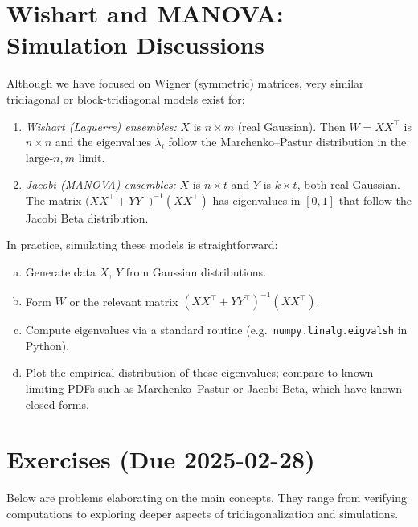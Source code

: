 \documentclass[letterpaper,11pt,oneside,reqno]{article}
\numberwithin{equation}{section}
\theoremstyle{definition}
\begin{document}
\section{Wishart and MANOVA: Simulation Discussions}
\label{sec:wishart-manova}

Although we have focused on Wigner (symmetric) matrices, very similar tridiagonal or block-tridiagonal models exist for:
\begin{enumerate}[(1)]
\item \emph{Wishart (Laguerre) ensembles:} $X$ is $n\times m$ (real Gaussian). Then $W=XX^\top$ is $n\times n$ and the eigenvalues $\lambda_i$ follow the Marchenko–Pastur distribution in the large-$n,m$ limit.
\item \emph{Jacobi (MANOVA) ensembles:} $X$ is $n\times t$ and $Y$ is $k\times t$, both real Gaussian. The matrix $\bigl(X X^\top + Y Y^\top\bigr)^{-1}(X X^\top)$ has eigenvalues in $[0,1]$ that follow the Jacobi Beta distribution.
\end{enumerate}

In practice, simulating these models is straightforward:

\begin{enumerate}[(a)]
\item Generate data $X$, $Y$ from Gaussian distributions.
\item Form $W$ or the relevant matrix $(X X^\top + Y Y^\top)^{-1} (X X^\top)$.
\item Compute eigenvalues via a standard routine (e.g.\ \texttt{numpy.linalg.eigvalsh} in Python).
\item Plot the empirical distribution of these eigenvalues; compare to known limiting PDFs such as Marchenko–Pastur or Jacobi Beta, which have known closed forms.
\end{enumerate}

\section{Exercises (Due 2025-02-28)}
\label{sec:exercises}

Below are problems elaborating on the main concepts. They range from verifying computations to exploring deeper aspects of tridiagonalization and simulations.
\end{document}
